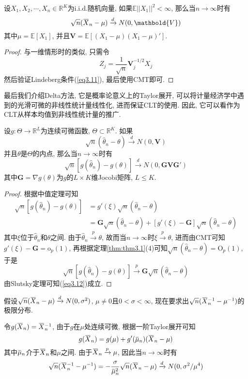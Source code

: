 \documentclass[cn, 12pt, math=mtpro2, bibstyle=apa, blue, twocol]{elegantbook}
\newcommand{\R}{\mathbb{R}}
\newcommand{\E}{\mathbb{E}}
\newcommand{\V}{\mathbold{V}}
\newcommand{\overbar}[1]{\mkern 1.5mu\overline{\mkern-1.5mu#1\mkern-1.5mu}\mkern 1.5mu}
\begin{document}
\begin{corollary}
  设$X_1,X_2,\cdots,X_n\in\R^K$为i.i.d.随机向量, 如果$\E||X_1||^2<\infty$, 那么当$n\to\infty$时有
  $$\sqrt{n}(\overbar{X}_n-\mu)\xrightarrow{d}N(0,\V)$$
  其中$\mu=\E[X_1]$, 并且$\V=\E[(X_1-\mu)(X_1-\mu)']$.
\end{corollary}
\begin{proof}
  与一维情形时的类似, 只需令
  $$Z_j=\frac{1}{\sqrt{n}}\V_j^{-1/2}X_j$$
  然后验证Lindeberg条件(\ref{eq3.11}), 最后使用CMT即可.
\end{proof}
最后我们介绍Delta方法, 它是概率论意义上的Taylor展开, 可以将计量经济学中遇到的光滑可微的非线性统计量线性化, 进而保证CLT的使用. 因此, 它可以看作为CLT从样本均值到非线性统计量的推广.
\begin{theorem}[Delta方法]
  设$g:\Theta\to\R^L$为连续可微函数, $\Theta\subset\R^K$. 如果
  $$\sqrt{n}(\hat{\theta}_n-\theta)\xrightarrow{d} N(0,\V)$$
  并且$\theta$是$\Theta$的内点, 那么当$n\to\infty$时有
  \begin{equation}\label{eq3.12}
    \sqrt{n}[g(\hat{\theta}_n)-g(\theta)]\xrightarrow{d}N(0,\mathbold{G}\V\mathbold{G}')
  \end{equation}
  其中$\mathbold{G}=\nabla g(\theta)$为$g$的$L\times K$维Jocobi矩阵, $L\leq K$.
\end{theorem}
\begin{proof}
  根据中值定理可知
  \begin{align*}
  \sqrt{n}[g(\hat{\theta}_n)-g(\theta)]&=g'(\xi)\sqrt{n}(\hat{\theta}_n-\theta) \\
  &=\mathbold{G}\sqrt{n}(\hat{\theta}_n-\theta)+[g'(\xi)-\mathbold{G}]\sqrt{n}(\hat{\theta}_n-\theta)
  \end{align*}
  其中$\xi$位于$\hat{\theta}_n$和$\theta$之间. 由于$\hat{\theta}_n\xrightarrow{p}\theta$, 故而当$n\to\infty$时$\xi\xrightarrow{p}\theta$, 进而由CMT可知$g'(\xi)-\mathbold{G}=\text{o}_p(1)$, 再根据定理\ref{thm:thm3.1}(4)可知$\sqrt{n}(\hat{\theta}_n-\theta)=\text{O}_p(1)$, 于是
  $$\sqrt{n}[g(\hat{\theta}_n)-g(\theta)]\xrightarrow{p}\mathbold{G}\sqrt{n}(\hat{\theta}_n-\theta)$$
  由Slutsky定理可知(\ref{eq3.12})成立.
\end{proof}
\begin{example}
假设$\sqrt{n}(\overbar{X}_n-\mu)\xrightarrow{d}N(0,\sigma^2)$, $\mu\neq0$且$0<\sigma<\infty$, 现在要求出$\sqrt{n}(\overbar{X}_n^{-1}-\mu^{-1})$的极限分布.

令$g(\overbar{X}_n)=\overbar{X}_n^{-1}$, 由于$g$在$\mu$处连续可微, 根据一阶Taylor展开可知
$$g(\overbar{X}_n)=g(\mu)+g'(\overbar{\mu}_n)(\overbar{X}_n-\mu)$$
其中$\overbar{\mu}_n$介于$\overbar{X}_n$和$\mu$之间. 由于$\overbar{X}_n\xrightarrow{p}\mu$, 因此当$n\to\infty$时有
$$\sqrt{n}(\overbar{X}_n^{-1}-\mu^{-1})=-\frac{\sigma}{\overbar{\mu}_n^2}\sqrt{n}(\overbar{X}_n-\mu)\xrightarrow{d}N(0,\sigma^2/\mu^4)$$
\end{example}
\end{document}
